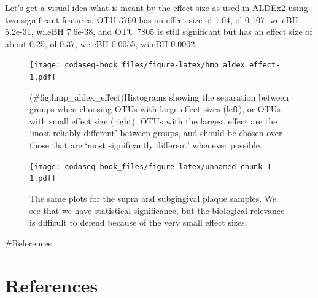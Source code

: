 \documentclass[
  onecolumn]{article}
\begin{document}
Let's get a visual idea what is meant by the effect size as used in ALDEx2 using two significant features. OTU 3760 has an effect size of 1.04, ol 0.107, we.eBH 5.2e-31, wi.eBH 7.6e-38, and OTU 7805 is still significant but has an effect size of about 0.25, ol 0.37, we.eBH 0.0055, wi.eBH 0.0002.

\begin{figure}
\centering
\texttt{[image: codaseq-book\_files/figure-latex/hmp\_aldex\_effect-1.pdf]}
\caption{(\#fig:hmp\_aldex\_effect)Histograms showing the separation between groups when choosing OTUs with large effect sizes (left), or OTUs with small effect size (right). OTUs with the largest effect are the `most reliably different' between groups, and should be chosen over those that are `most significantly different' whenever possible.}
\end{figure}

\newpage

\begin{figure}
\centering
\texttt{[image: codaseq-book\_files/figure-latex/unnamed-chunk-1-1.pdf]}
\caption{\label{fig:unnamed-chunk-1}The same plots for the supra and subgingival plaque samples. We see that we have statistical significance, but the biological relevance is difficult to defend because of the very small effect sizes.}
\end{figure}

\newpage

\#References

\hypertarget{references}{%
\section{References}\label{references}}
\end{document}

